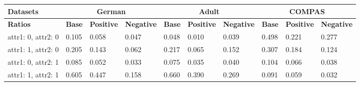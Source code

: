 
\begin{table*}[h!]
\begin{tabular}{|c|l|l|l|l|l|l|l|l|l|}
\hline
\multicolumn{1}{|l|}{\textbf{Datasets}} & \multicolumn{3}{c|}{\textbf{German}}                                                                                 & \multicolumn{3}{c|}{\textbf{Adult}}                                                                                  & \multicolumn{3}{c|}{\textbf{COMPAS}}                                                                                 \\ \hline
\multicolumn{1}{|l|}{\textbf{Ratios}}   & \multicolumn{1}{c|}{\textbf{Base}} & \multicolumn{1}{c|}{\textbf{Positive}} & \multicolumn{1}{c|}{\textbf{Negative}} & \multicolumn{1}{c|}{\textbf{Base}} & \multicolumn{1}{c|}{\textbf{Positive}} & \multicolumn{1}{c|}{\textbf{Negative}} & \multicolumn{1}{c|}{\textbf{Base}} & \multicolumn{1}{c|}{\textbf{Positive}} & \multicolumn{1}{c|}{\textbf{Negative}} \\ \hline
attr1: 0, attr2: 0                      & 0.105                              & 0.058                                  & 0.047                                  & 0.048                              & 0.010                                  & 0.039                                  & 0.498                              & 0.221                                  & 0.277                                  \\ \hline
attr1: 1, attr2: 0                      & 0.205                              & 0.143                                  & 0.062                                  & 0.217                              & 0.065                                  & 0.152                                  & 0.307                              & 0.184                                  & 0.124                                  \\ \hline
attr1: 0, attr2: 1                      & 0.085                              & 0.052                                  & 0.033                                  & 0.075                              & 0.035                                  & 0.040                                  & 0.104                              & 0.066                                  & 0.038                                  \\ \hline
attr1: 1, attr2: 1                      & 0.605                              & 0.447                                  & 0.158                                  & 0.660                              & 0.390                                  & 0.269                                  & 0.091                              & 0.059                                  & 0.032                                  \\ \hline

\end{tabular}
\end{table*}
